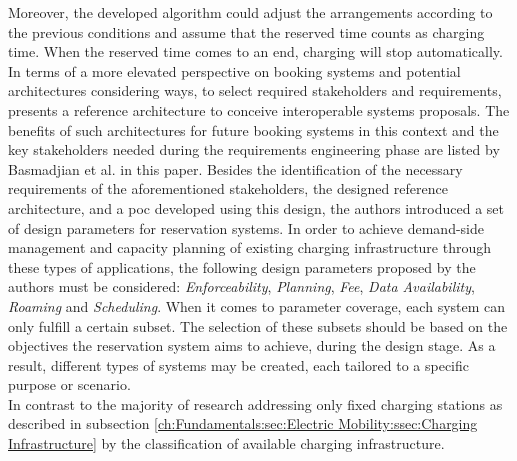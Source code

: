 Moreover, the developed algorithm could adjust the arrangements according to the previous conditions and assume that the reserved time counts as charging time. When the reserved time comes to an end, charging will stop automatically. \\
\noindent In terms of a more elevated perspective on booking systems and potential architectures considering ways, to select required stakeholders and requirements, \cite{basmadjian_reference_2020} presents a reference architecture to conceive interoperable systems proposals.
The benefits of such architectures for future booking systems in this context and the key stakeholders needed during the requirements engineering phase are listed by Basmadjian et al. in this paper.
Besides the identification of the necessary requirements of the aforementioned stakeholders, the designed reference architecture, and a \acrshort{poc} developed using this design, the authors introduced a set of design parameters for reservation systems.
In order to achieve demand-side management and capacity planning of existing charging infrastructure through these types of applications, the following design parameters proposed by the authors must be considered: \textit{Enforceability}, \textit{Planning}, \textit{Fee}, \textit{Data Availability}, \textit{Roaming} and \textit{Scheduling}.
When it comes to parameter coverage, each system can only fulfill a certain subset. The selection of these subsets should be based on the objectives the reservation system aims to achieve, during the design stage.
As a result, different types of systems may be created, each tailored to a specific purpose or scenario. \\
\noindent In contrast to the majority of research addressing only fixed charging stations as described in subsection \ref{ch:Fundamentals:sec:Electric Mobility:ssec:Charging Infrastructure} by the classification of available charging infrastructure. 

